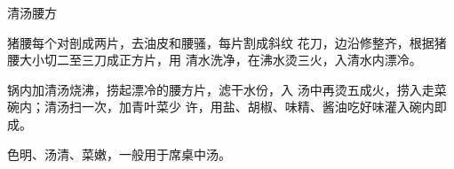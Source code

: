 \begin{recipe}{清汤腰方}

\ingredients


\cooking

\step 猪腰每个对剖成两片，去油皮和腰骚，每片割成斜纹 花刀，边沿修整齐，根据猪腰大小切二至三刀成正方片，用 清水洗净，在沸水烫三火，入清水内漂冷。

\step 锅内加清汤烧沸，捞起漂冷的腰方片，滤干水份，入 汤中再烫五成火，捞入走菜碗内；清汤扫一次，加青叶菜少 许，用盐、胡椒、味精、酱油吃好味灌入碗内即成。

\notes

色明、汤清、菜嫩，一般用于席桌中汤。

\end{recipe}

